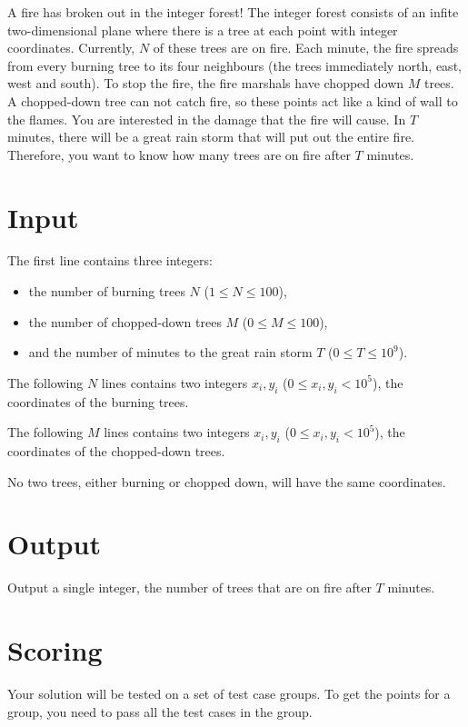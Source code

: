 \def\version{jury-2}
\noindent
A fire has broken out in the integer forest!
The integer forest consists of an infite two-dimensional plane where there is a tree at each point with integer coordinates.
Currently, $N$ of these trees are on fire.
Each minute, the fire spreads from every burning tree to its four neighbours (the trees immediately north, east, west and south).
To stop the fire, the fire marshals have chopped down $M$ trees.
A chopped-down tree can not catch fire, so these points act like a kind of wall to the flames.
You are interested in the damage that the fire will cause.
In $T$ minutes, there will be a great rain storm that will put out the entire fire.
Therefore, you want to know how many trees are on fire after $T$ minutes.

\section*{Input}
The first line contains three integers:
\begin{itemize}
        \item the number of burning trees $N$ ($1 \leq N \leq 100$),
        \item the number of chopped-down trees $M$ ($0 \leq M \leq 100$),
        \item and the number of minutes to the great rain storm $T$ ($0 \leq T \leq 10^9$).
\end{itemize}

The following $N$ lines contains two integers $x_i,y_i$ ($0 \leq x_i, y_i < 10^5$), the coordinates of the burning trees.

The following $M$ lines contains two integers $x_i,y_i$ ($0 \leq x_i, y_i < 10^5$), the coordinates of the chopped-down trees.

No two trees, either burning or chopped down, will have the same coordinates.

\section*{Output}
Output a single integer, the number of trees that are on fire after $T$ minutes.

\section*{Scoring}
Your solution will be tested on a set of test case groups.
To get the points for a group, you need to pass all the test cases in the group.

